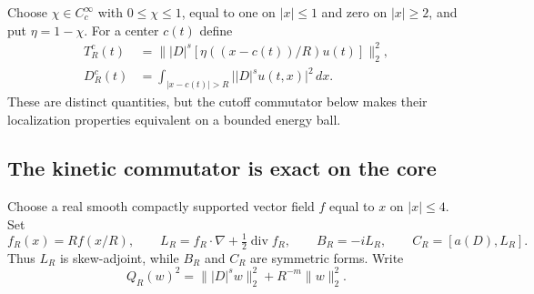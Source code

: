 Choose $\chi\in C_c^\infty$ with $0\le\chi\le1$, equal to one on
$|x|\le1$ and zero on $|x|\ge2$, and put $\eta=1-\chi$.
For a center $c(t)$ define
\begin{align}
 T_R^c(t)&=\bigl\||D|^s[\eta((x-c(t))/R)u(t)]\bigr\|_2^2,
 \label{r11tr:cut-tail}\\
 D_R^c(t)&=\int_{|x-c(t)|>R}\bigl||D|^s u(t,x)\bigr|^2\,dx.
 \label{r11tr:literal-tail}
\end{align}
These are distinct quantities, but the cutoff commutator below makes
their localization properties equivalent on a bounded energy ball.

\subsection{The kinetic commutator is exact on the core}
Choose a real smooth compactly supported vector field $f$ equal to $x$
on $|x|\le4$. Set
\[
 f_R(x)=Rf(x/R),\qquad
 L_R=f_R\cdot\nabla+\tfrac12\operatorname{div}f_R,
 \qquad B_R=-iL_R,
 \qquad C_R=[a(D),L_R].
\]
Thus $L_R$ is skew-adjoint, while $B_R$ and $C_R$ are symmetric forms.
Write
\[
 Q_R(w)^2=\||D|^s w\|_2^2+R^{-m}\|w\|_2^2.
\]

